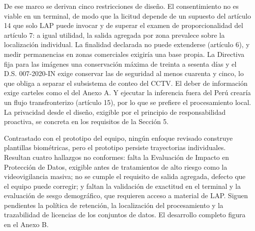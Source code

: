 De ese marco se derivan cinco restricciones de diseño. El consentimiento
no es viable en un terminal, de modo que la licitud depende de un
supuesto del artículo 14 que solo LAP puede invocar y de superar el
examen de proporcionalidad del artículo 7: a igual utilidad, la salida
agregada por zona prevalece sobre la localización individual. La
finalidad declarada no puede extenderse (artículo 6), y medir
permanencias en zonas comerciales exigiría una base propia. La Directiva
fija para las imágenes una conservación máxima de treinta a sesenta días
y el D.S. 007-2020-IN exige conservar las de seguridad al menos cuarenta
y cinco, lo que obliga a separar el subsistema de conteo del CCTV. El
deber de información exige carteles como el del Anexo A. Y ejecutar la
inferencia fuera del Perú crearía un flujo transfronterizo (artículo
15), por lo que se prefiere el procesamiento local. La privacidad desde
el diseño, exigible por el principio de responsabilidad proactiva, se
concreta en los requisitos de la Sección 5.

Contrastado con el prototipo del equipo, ningún enfoque revisado
construye plantillas biométricas, pero el prototipo persiste
trayectorias individuales. Resultan cuatro hallazgos no conformes: falta
la Evaluación de Impacto en Protección de Datos, exigible antes de
tratamientos de alto riesgo como la videovigilancia masiva; no se cumple
el requisito de salida agregada, defecto que el equipo puede corregir; y
faltan la validación de exactitud en el terminal y la evaluación de
sesgo demográfico, que requieren acceso a material de LAP. Siguen
pendientes la política de retención, la localización del procesamiento y
la trazabilidad de licencias de los conjuntos de datos. El desarrollo
completo figura en el Anexo B.
